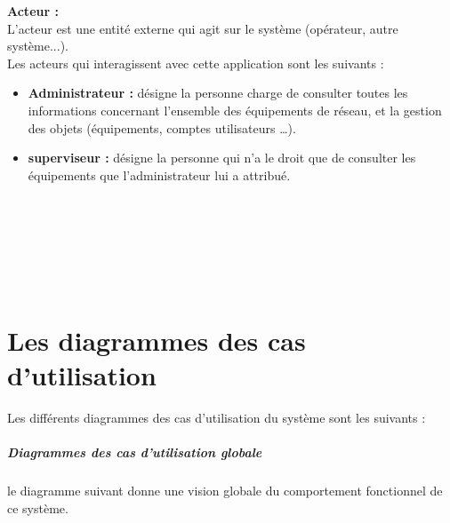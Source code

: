 \textbf{Acteur :\\} L'acteur est une entité externe qui agit sur le système (opérateur, autre système...).\\
Les acteurs qui interagissent avec cette application sont les suivants :
\begin{itemize}
\item \textbf{Administrateur :} désigne la personne charge de consulter toutes les informations concernant l'ensemble des équipements de réseau, et la gestion des objets (équipements, comptes utilisateurs …).
\item \textbf{superviseur :} désigne la personne qui n'a le droit que de consulter les équipements que l'administrateur lui a attribué.
\end{itemize}

\paragraph{\\}
\paragraph{\\}
\paragraph{\\}

\section{Les diagrammes des cas d'utilisation}
Les différents diagrammes des cas d'utilisation du système sont les suivants :
\subparagraph{Diagrammes des cas d'utilisation globale}
le diagramme suivant donne une vision globale du comportement fonctionnel de ce système.

\paragraph{\\}
\paragraph{\\}
\paragraph{\\}

